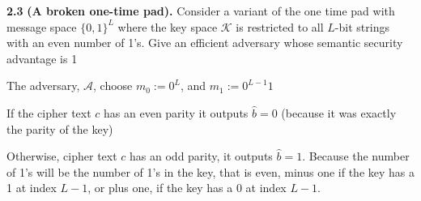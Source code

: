 
\newpage
\noindent
\textbf{2.3}
\textbf{(A broken one-time pad).} Consider a variant of the one time pad with message space
$\{0, 1\}^L$ where the key space $\mathcal{K}$ is restricted to all $L$-bit strings with an even number of 1’s. Give an
efficient adversary whose semantic security advantage is 1


\begin{tcolorbox}[solutionbox, title=Answer]
    The adversary, $\mathcal{A}$, choose $m_0 := 0^L$, and $m_1 := 0^{L-1}1$
    \vspace{1em}

    If the cipher text $c$ has an even parity it outputs $\hat{b} = 0$ (because it was exactly the parity of the key)
    \vspace{1em}

    Otherwise, cipher text $c$ has an odd parity, it outputs $\hat{b} = 1$. Because the number of 1's will be the number of 1's in the key, that is even, minus one if the key has a 1 at index $L-1$, or plus one, if the key has a 0 at index $L-1$.

\end{tcolorbox}
